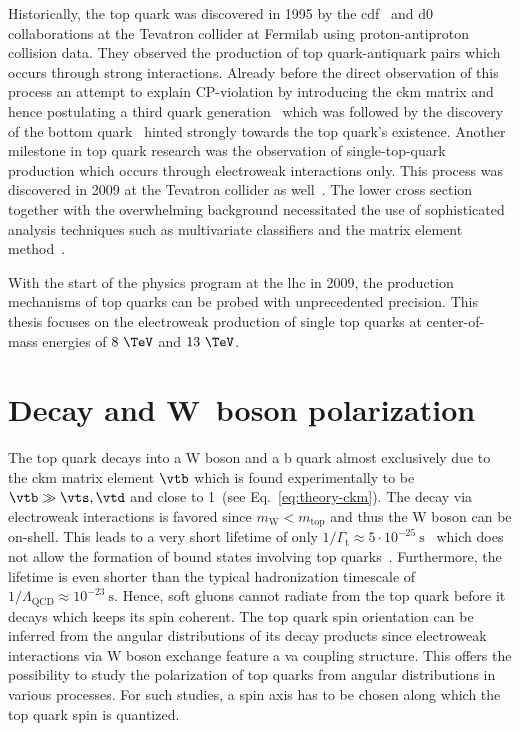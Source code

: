 Historically, the top quark was discovered in 1995 by the \gls{cdf}~\cite{Abe:1995hr} and \gls{d0}~\cite{Abachi:1994td} collaborations at the Tevatron collider at Fermilab using proton-antiproton collision data. They observed the production of top quark-antiquark pairs which occurs through strong interactions. Already before the direct observation of this process an attempt to explain CP-violation by introducing the \gls{ckm} matrix and hence postulating a third quark generation~\cite{Kobayashi01021973} which was followed by the discovery of the bottom quark~\cite{Augustin:1975yq,PhysRevLett.39.252} hinted strongly towards the top quark's existence. Another milestone in top quark research was the observation of single-top-quark production which occurs through electroweak interactions only. This process was discovered in 2009 at the Tevatron collider as well~\cite{PhysRevLett.103.092002,PhysRevLett.103.092001}. The lower cross section together with the overwhelming background necessitated the use of sophisticated analysis techniques such as multivariate classifiers and the matrix element method~\cite{Mitrevski}.

With the start of the physics program at the \gls{lhc} in 2009, the production mechanisms of top quarks can be probed with unprecedented precision. This thesis focuses on the electroweak production of single top quarks at center-of-mass energies of $8~\TeV$ and $13~\TeV$.


\section{Decay and W~boson polarization}
\label{sec:theory-top-quark-decay}

The top quark decays into a W boson and a b quark almost exclusively due to the \gls{ckm} matrix element $\vtb$ which is found experimentally to be $\vtb\gg\vts,\vtd$ and close to 1~(see Eq.~\ref{eq:theory-ckm}). The decay via electroweak interactions is favored since $m_\mathrm{W}<m_\mathrm{top}$ and thus the W boson can be on-shell. This leads to a very short lifetime of only $1/\Gamma_\mathrm{t}\approx 5\cdot10^{-25}~\mathrm{s}$~\cite{Olive:2016xmw} which does not allow the formation of bound states involving top quarks~\cite{BIGI1986157}. Furthermore, the lifetime is even shorter than the typical hadronization timescale of $1/\Lambda_\mathrm{QCD}\approx 10^{-23}~\mathrm{s}$. Hence, soft gluons cannot radiate from the top quark before it decays which keeps its spin coherent. The top quark spin orientation can be inferred from the angular distributions of its decay products since electroweak interactions via $\mathrm{W}$ boson exchange feature a \gls{va} coupling structure. This offers the possibility to study the polarization of top quarks from angular distributions in various processes. For such studies, a spin axis has to be chosen along which the top quark spin is quantized.


